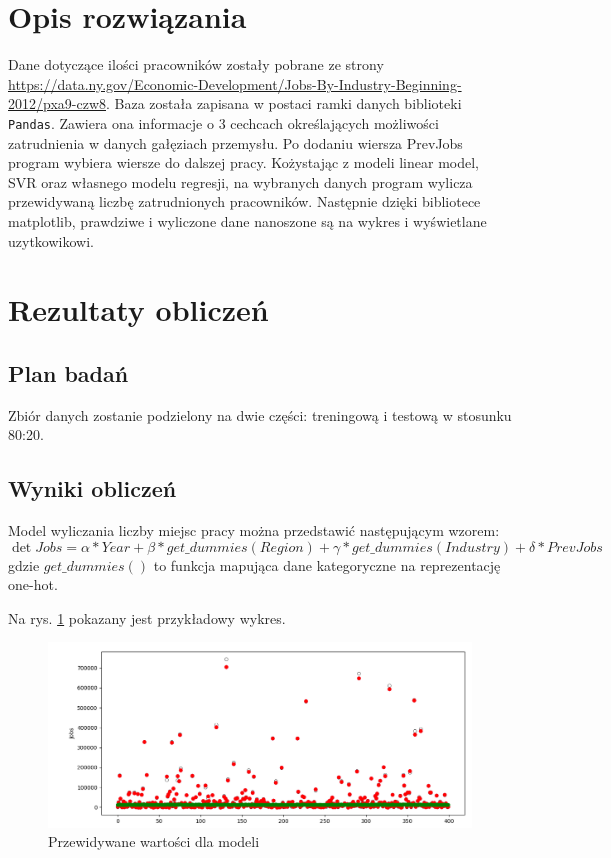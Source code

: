 \documentclass[10pt]{article}
\begin{document}
    
\section{Opis rozwiązania}

Dane dotyczące ilości pracowników zostały pobrane ze strony  \url{https://data.ny.gov/Economic-Development/Jobs-By-Industry-Beginning-2012/pxa9-czw8}. Baza została zapisana w postaci ramki danych biblioteki \texttt{Pandas}. Zawiera ona informacje o 3 cechcach określających możliwości zatrudnienia w danych gałęziach przemysłu.
    Po dodaniu wiersza PrevJobs program wybiera wiersze do dalszej pracy.
Kożystając z modeli linear model, SVR oraz własnego modelu regresji, na wybranych danych program wylicza przewidywaną liczbę zatrudnionych pracowników. Następnie dzięki bibliotece matplotlib, prawdziwe i wyliczone dane nanoszone są na wykres i wyświetlane uzytkowikowi. 

\section{Rezultaty obliczeń}

\subsection{Plan badań}
Zbiór danych zostanie podzielony na dwie części: treningową i testową w stosunku 80:20. 


\subsection{Wyniki obliczeń} 
Model wyliczania liczby miejsc pracy można przedstawić następującym wzorem: 
\begin{equation}
\det Jobs = \alpha * Year + \beta * get\_dummies(Region) + \gamma * get\_dummies(Industry) + \delta * PrevJobs 
\label{eq:wzor_wazny}
\end{equation}
gdzie $get\_dummies()$ to funkcja mapująca dane kategoryczne na reprezentację one-hot.

Na rys. \ref{fig:korelacje} pokazany jest przykładowy wykres. 
\begin{figure}[!hbt]
\begin{center}
\includegraphics[width=0.8\linewidth]{rys1.png}
\caption{Przewidywane wartości dla modeli}
\label{fig:korelacje}
\end{center}
\end{figure}
\end{document}
